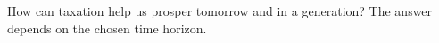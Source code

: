 How can taxation help us prosper tomorrow and in a generation?
The answer depends on the chosen time horizon.


